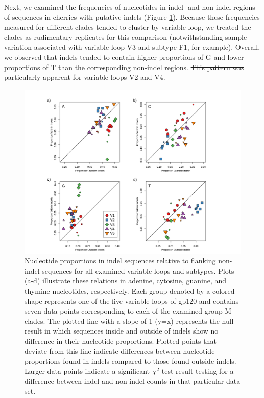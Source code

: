 \documentclass[12pt]{article}
\providecommand{\DIFdel}[1]{{\protect\color{red}\sout{#1}}}                      %
\providecommand{\DIFdelbegin}{} %
\providecommand{\DIFdelend}{} %
\newcommand{\DIFscaledelfig}{0.5}
\newlength{\DIFdelgraphicswidth} %
\newlength{\DIFdelgraphicsheight} %
\newcommand{\DIFdelincludegraphics}[2][]{%
\sbox{\DIFdelgraphicsbox}{\DIFOincludegraphics[#1]{#2}}%
\settoboxwidth{\DIFdelgraphicswidth}{\DIFdelgraphicsbox} %
\settoboxtotalheight{\DIFdelgraphicsheight}{\DIFdelgraphicsbox} %
\scalebox{\DIFscaledelfig}{%
\parbox[b]{\DIFdelgraphicswidth}{\usebox{\DIFdelgraphicsbox}\\[-\baselineskip] \rule{\DIFdelgraphicswidth}{0em}}\llap{\resizebox{\DIFdelgraphicswidth}{\DIFdelgraphicsheight}{%
\setlength{\unitlength}{\DIFdelgraphicswidth}%
\begin{picture}(1,1)%
\thicklines\linethickness{2pt} %
{\color[rgb]{1,0,0}\put(0,0){\framebox(1,1){}}}%
{\color[rgb]{1,0,0}\put(0,0){\line( 1,1){1}}}%
{\color[rgb]{1,0,0}\put(0,1){\line(1,-1){1}}}%
\end{picture}%
}\hspace*{3pt}}} %
} %
\DeclareRobustCommand{\DIFdelbegin}{\DIFOdelbegin \let\includegraphics\DIFdelincludegraphics} %
\DeclareRobustCommand{\DIFdelend}{\DIFOaddend \let\includegraphics\DIFOincludegraphics} %
\begin{document}
Next, we examined the frequencies of nucleotides in indel- and non-indel regions of sequences in cherries with putative indels (Figure \ref{nt-plot}).  
Because these frequencies measured for different clades tended to cluster by variable loop, we treated the clades as rudimentary replicates for this comparison (notwithstanding sample variation associated with variable loop V3 and subtype F1, for example).
Overall, we observed that indels tended to contain higher proportions of G and lower proportions of T than the corresponding non-indel regions.
\DIFdelbegin \DIFdel{This pattern was particularly apparent for variable loops V2 and V4.
}\DIFdelend %


\begin{figure}
    \centering
    \includegraphics[width=1.05\textwidth,trim={2.85cm 0 2.9cm 0},clip]{nt-plot}
    \caption{ 
    Nucleotide proportions in indel sequences relative to flanking non-indel sequences for all examined variable loops and subtypes. 
    Plots (a-d) illustrate these relations in adenine, cytosine, guanine, and thymine nucleotides, respectively.  
    Each group denoted by a colored shape represents one of the five variable loops of gp120 and contains seven data points corresponding to each of the examined group M clades. 
    The plotted line with a slope of 1 (y=x) represents the null result in which sequences inside and outside of indels show no difference in their nucleotide proportions. 
    Plotted points that deviate from this line indicate differences between nucleotide proportions found in indels compared to those found outside indels. 
    Larger data points indicate a significant $\chi^2$ test result testing for a difference between indel and non-indel counts in that particular data set.
    }
    \label{nt-plot}
\end{figure}
\end{document}
